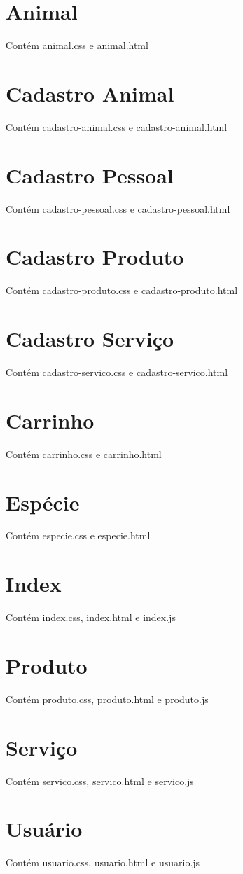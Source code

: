 \section{Animal}
Contém animal.css e animal.html
\section{Cadastro Animal}
Contém cadastro-animal.css e cadastro-animal.html
\section{Cadastro Pessoal}
Contém cadastro-pessoal.css e cadastro-pessoal.html
\section{Cadastro Produto}
Contém cadastro-produto.css e cadastro-produto.html
\section{Cadastro Serviço}
Contém cadastro-servico.css e cadastro-servico.html
\section{Carrinho}
Contém carrinho.css e carrinho.html
\section{Espécie}
Contém especie.css e especie.html
\section{Index}
Contém index.css, index.html e index.js
\section{Produto}
Contém produto.css, produto.html e produto.js
\section{Serviço}
Contém servico.css, servico.html e servico.js
\section{Usuário}
Contém usuario.css, usuario.html e usuario.js
